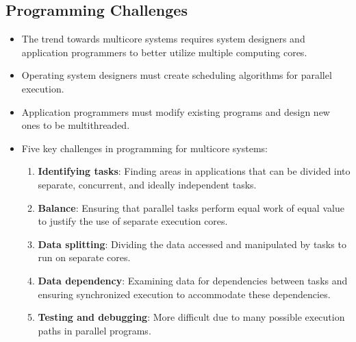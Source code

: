 \subsection{Programming Challenges}
\begin{itemize}
    \item The trend towards multicore systems requires system designers and application programmers to better utilize multiple computing cores.
    \item Operating system designers must create scheduling algorithms for parallel execution.
    \item Application programmers must modify existing programs and design new ones to be multithreaded.
    \item Five key challenges in programming for multicore systems:
        \begin{enumerate}
            \item \textbf{Identifying tasks}: Finding areas in applications that can be divided into separate, concurrent, and ideally independent tasks.
            \item \textbf{Balance}: Ensuring that parallel tasks perform equal work of equal value to justify the use of separate execution cores.
            \item \textbf{Data splitting}: Dividing the data accessed and manipulated by tasks to run on separate cores.
            \item \textbf{Data dependency}: Examining data for dependencies between tasks and ensuring synchronized execution to accommodate these dependencies.
            \item \textbf{Testing and debugging}: More difficult due to many possible execution paths in parallel programs.
        \end{enumerate}
\end{itemize}

